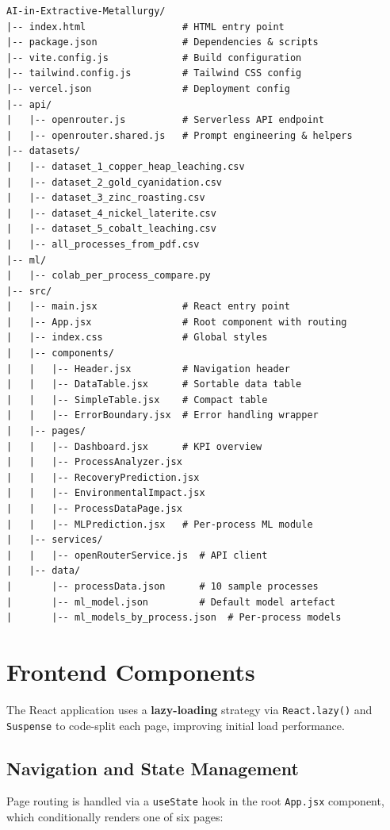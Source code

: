\documentclass[12pt,a4paper]{report}
\newcommand{\code}[1]{\texttt{#1}}
\begin{document}
\begin{lstlisting}[language={}, caption={Project directory tree.}, label={lst:dirtree}]
AI-in-Extractive-Metallurgy/
|-- index.html                 # HTML entry point
|-- package.json               # Dependencies & scripts
|-- vite.config.js             # Build configuration
|-- tailwind.config.js         # Tailwind CSS config
|-- vercel.json                # Deployment config
|-- api/
|   |-- openrouter.js          # Serverless API endpoint
|   |-- openrouter.shared.js   # Prompt engineering & helpers
|-- datasets/
|   |-- dataset_1_copper_heap_leaching.csv
|   |-- dataset_2_gold_cyanidation.csv
|   |-- dataset_3_zinc_roasting.csv
|   |-- dataset_4_nickel_laterite.csv
|   |-- dataset_5_cobalt_leaching.csv
|   |-- all_processes_from_pdf.csv
|-- ml/
|   |-- colab_per_process_compare.py
|-- src/
|   |-- main.jsx               # React entry point
|   |-- App.jsx                # Root component with routing
|   |-- index.css              # Global styles
|   |-- components/
|   |   |-- Header.jsx         # Navigation header
|   |   |-- DataTable.jsx      # Sortable data table
|   |   |-- SimpleTable.jsx    # Compact table
|   |   |-- ErrorBoundary.jsx  # Error handling wrapper
|   |-- pages/
|   |   |-- Dashboard.jsx      # KPI overview
|   |   |-- ProcessAnalyzer.jsx
|   |   |-- RecoveryPrediction.jsx
|   |   |-- EnvironmentalImpact.jsx
|   |   |-- ProcessDataPage.jsx
|   |   |-- MLPrediction.jsx   # Per-process ML module
|   |-- services/
|   |   |-- openRouterService.js  # API client
|   |-- data/
|       |-- processData.json      # 10 sample processes
|       |-- ml_model.json         # Default model artefact
|       |-- ml_models_by_process.json  # Per-process models
\end{lstlisting}

\section{Frontend Components}

The React application uses a \textbf{lazy-loading} strategy via \code{React.lazy()} and \code{Suspense} to code-split each page, improving initial load performance.

\subsection{Navigation and State Management}

Page routing is handled via a \code{useState} hook in the root \code{App.jsx} component, which conditionally renders one of six pages:
\end{document}
